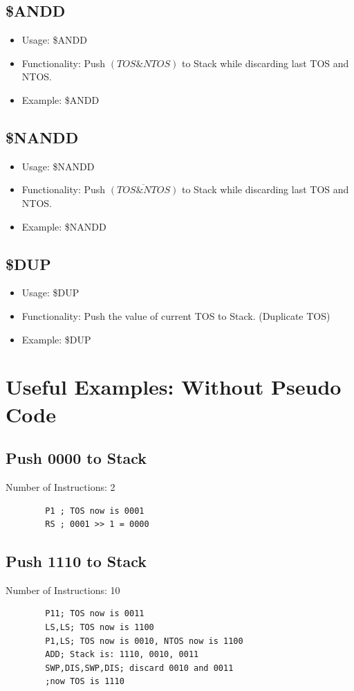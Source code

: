 \documentclass[11pt]{report}
\begin{document}
    \subsection{\$ANDD}
    \begin{itemize}
        \item Usage: \$ANDD
        \item Functionality: Push $(TOS \& NTOS)$ to Stack while discarding last TOS and NTOS.
        \item Example: \$ANDD
    \end{itemize}
    \subsection{\$NANDD}
    \begin{itemize}
        \item Usage: \$NANDD
        \item Functionality: Push $\overline{(TOS \& NTOS)}$ to Stack while discarding last TOS and NTOS.
        \item Example: \$NANDD
    \end{itemize}
    \subsection{\$DUP}
    \begin{itemize}
        \item Usage: \$DUP
        \item Functionality: Push the value of current TOS to Stack. (Duplicate TOS)
        \item Example: \$DUP
    \end{itemize}

    \section{Useful Examples: Without Pseudo Code}
    \subsection{Push 0000 to Stack}
    Number of Instructions: 2
    \begin{verbatim}
        P1 ; TOS now is 0001
        RS ; 0001 >> 1 = 0000
    \end{verbatim}

    \subsection{Push 1110 to Stack}
    Number of Instructions: 10
    \begin{verbatim}
        P11; TOS now is 0011
        LS,LS; TOS now is 1100
        P1,LS; TOS now is 0010, NTOS now is 1100
        ADD; Stack is: 1110, 0010, 0011
        SWP,DIS,SWP,DIS; discard 0010 and 0011
        ;now TOS is 1110
    \end{verbatim}
\end{document}
